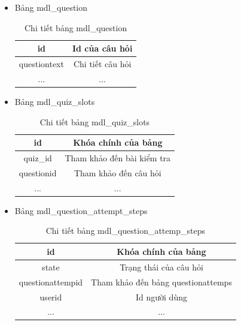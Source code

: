 \begin{itemize}
\begin{center}
\begin{table}[!htp]
			\caption{Chi tiết bảng mdl\_quiz}
			\label{bang11}
		\end{table}
	\end{center}
	\newpage
	\item Bảng mdl\_question
	\begin{center}
		\begin{table}[!htp]
			\centering
			\begin{tabular}{|c|c|}
				\hline 
				id & Id của câu hỏi \\ 
				\hline 
				questiontext & Chi tiết câu hỏi \\ 
				\hline 
				... & ... \\ 
				\hline 
			\end{tabular} 
			\caption{Chi tiết bảng mdl\_question}
			\label{bang12}
		\end{table}
	\end{center}
	\item Bảng mdl\_quiz\_slots
	\begin{center}
		\begin{table}[!htp]
			\centering
			\begin{tabular}{|c|c|}
				\hline 
				id & Khóa chính của bảng \\ 
				\hline 
				quiz\_id & Tham khảo đến bài kiểm tra \\ 
				\hline 
				questionid & Tham khảo đến câu hỏi \\ 
				\hline 
				... & ... \\ 
				\hline 
			\end{tabular} 
			\caption{Chi tiết bảng mdl\_quiz\_slots}
			\label{bang13}
		\end{table}
	\end{center}
	\item Bảng mdl\_question\_attempt\_steps
	\begin{center}
		\begin{table}[!htp]
			\centering
			\begin{tabular}{|c|c|}
				\hline 
				id & Khóa chính của bảng \\ 
				\hline 
				state & Trạng thái của câu hỏi \\ 
				\hline 
				questionattempid & Tham khảo đến bảng questionattemps \\ 
				\hline 
				userid & Id người dùng \\
				\hline
				... & ... \\ 
				\hline 
			\end{tabular} 
			\caption{Chi tiết bảng mdl\_question\_attemp\_steps}

\end{table}
\end{center}
\end{itemize}
